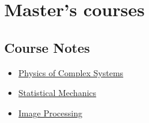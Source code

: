 \documentclass{article}
\begin{document}
\section{Master's courses}

\subsection{Course Notes}

    \begin{itemize}
        \item \href{source/m_physics_of_complex_systems.html}{Physics of Complex Systems}
        \item \href{source/m_statistical_mechanics.html}{Statistical Mechanics}
        \item \href{source/m_image_processing.html}{Image Processing}
    \end{itemize}
\end{document}
